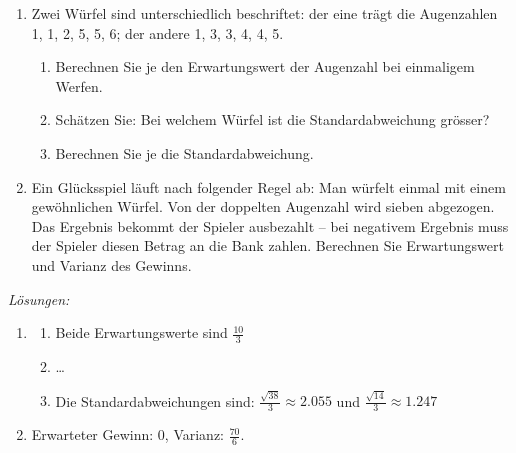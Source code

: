 \begin{ueb}
    {}{}
    \begin{enumerate}
        \item Zwei Würfel sind unterschiedlich beschriftet: der eine trägt die Augenzahlen 1, 1, 2, 5, 5, 6; der andere 1, 3, 3, 4, 4, 5.
              \begin{enumerate}
                  \item Berechnen Sie je den Erwartungswert der Augenzahl bei einmaligem Werfen.
                  \item Schätzen Sie: Bei welchem Würfel ist die Standardabweichung grösser?
                  \item Berechnen Sie je die Standardabweichung.
              \end{enumerate}

        \item Ein Glücksspiel läuft nach folgender Regel ab: Man würfelt einmal mit einem gewöhnlichen Würfel. Von der doppelten Augenzahl wird sieben abgezogen. Das Ergebnis bekommt der Spieler ausbezahlt – bei negativem Ergebnis muss der Spieler diesen Betrag an die Bank zahlen. Berechnen Sie Erwartungswert und Varianz des Gewinns.

    \end{enumerate}
\end{ueb}
\clearpage
\emph{Lösungen:}
\begin{enumerate}
    \item
          \begin{enumerate}
              \item Beide Erwartungswerte sind \(\frac{10}{3}\)
              \item \dots
              \item Die Standardabweichungen sind: \(\frac{\sqrt{38}}{3}\approx 2.055\) und \(\frac{\sqrt{14}}{3} \approx 1.247\)
          \end{enumerate}
    \item Erwarteter Gewinn: \(0\), Varianz: \(\frac{70}{6}\).
\end{enumerate}